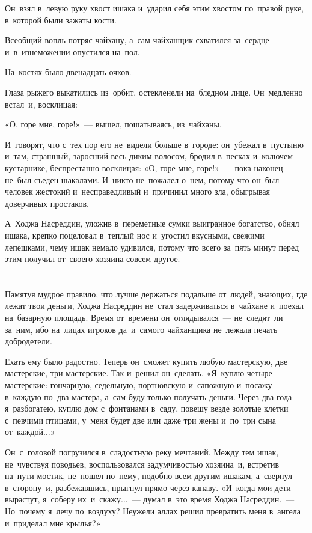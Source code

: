 \documentclass[12pt,a4paper]{book}
\begin{document}
Он~взял в~левую руку хвост ишака и~ударил себя этим хвостом по~правой руке, в~которой были зажаты кости.

Всеобщий вопль потряс чайхану, а~сам чайханщик схватился за~сердце и~в~изнеможении опустился на~пол.

На~костях было двенадцать очков.

Глаза рыжего выкатились из~орбит, остекленели на~бледном лице. Он~медленно встал~и, восклицая:

«О, горе мне, горе!»~— вышел, пошатываясь, из~чайханы.

И~говорят, что с~тех пор его не~видели больше в~городе: он~убежал в~пустыню и~там, страшный, заросший весь диким волосом, бродил в~песках и~колючем кустарнике, беспрестанно восклицая: «О, горе мне, горе!»~— пока наконец не~был съеден шакалами. И~никто не~пожалел о~нем, потому что он~был человек жестокий и~несправедливый и~причинил много зла, обыгрывая доверчивых простаков.

А~Ходжа Насреддин, уложив в~переметные сумки выигранное богатство, обнял ишака, крепко поцеловал в~теплый нос и~угостил вкусными, свежими лепешками, чему ишак немало удивился, потому что всего за~пять минут перед этим получил от~своего хозяина совсем другое.


\chapter{}

Памятуя мудрое правило, что лучше держаться подальше от~людей, знающих, где лежат твои деньги, Ходжа Насреддин не~стал задерживаться в~чайхане и~поехал на~базарную площадь. Время от~времени он~оглядывался~— не~следят~ли за~ним, ибо на~лицах игроков да~и~самого чайханщика не~лежала печать добродетели.

Ехать ему было радостно. Теперь он~сможет купить любую мастерскую, две мастерские, три мастерские. Так и~решил он~сделать. «Я~куплю четыре мастерские: гончарную, седельную, портновскую и~сапожную и~посажу в~каждую по~два мастера, а~сам буду только получать деньги. Через два года я~разбогатею, куплю дом с~фонтанами в~саду, повешу везде золотые клетки с~певчими птицами, у~меня будет две или даже три жены и~по~три сына от~каждой...»

Он~с~головой погрузился в~сладостную реку мечтаний. Между тем ишак, не~чувствуя поводьев, воспользовался задумчивостью хозяина~и, встретив на~пути мостик, не~пошел по~нему, подобно всем другим ишакам, а~свернул в~сторону~и, разбежавшись, прыгнул прямо через канаву. «И~когда мои дети вырастут, я~соберу их~и~скажу...~— думал в~это время Ходжа Насреддин.~— Но~почему я~лечу по~воздуху? Неужели аллах решил превратить меня в~ангела и~приделал мне крылья?»
\end{document}
